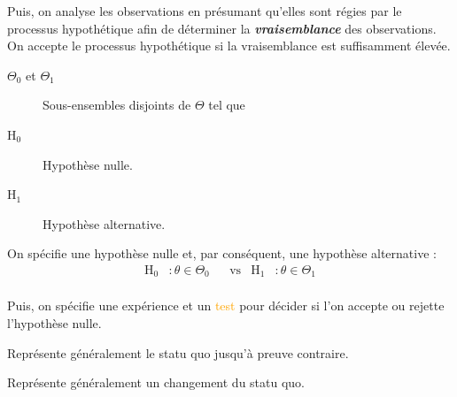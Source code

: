 \documentclass[french]{article}
\begin{document}
\begin{multicols*}{2}
\begin{rappel_enhanced}[Contexte]
\bigskip

Puis, on analyse les observations en présumant qu'elles sont régies par le processus hypothétique afin de déterminer la \textit{\textbf{vraisemblance}} des observations. On accepte le processus hypothétique si la vraisemblance est suffisamment élevée.



\end{rappel_enhanced}

\begin{distributions}[Notation]
\begin{description}
	\item[$\Theta_{0}$ et $\Theta_{1}$]	Sous-ensembles disjoints de $\Theta$ tel que 
	\item[$\textrm{H}_{0}$]	Hypothèse nulle.
	\item[$\textrm{H}_{1}$]	Hypothèse alternative.
\end{description}
\end{distributions}


\begin{definitionNOHFILL}
On spécifie une \textcolor{burntorange}{hypothèse} nulle et, par conséquent, une hypothèse alternative :
\begin{align*}
	\textrm{H}_{0}
	&:	\theta \in \Theta_{0}	&
	&\text{vs}	&
	\textrm{H}_{1}
	&:	\theta \in \Theta_{1}	\\
\end{align*}

Puis, on spécifie une \textcolor{orange-red}{expérience} et un \textcolor{orange}{test} pour décider si l'on accepte ou rejette l'hypothèse nulle.

\begin{definitionNOHFILLsub}
Représente généralement le statu quo jusqu'à preuve contraire.
\end{definitionNOHFILLsub}

\begin{definitionNOHFILLsub}
Représente généralement un changement du statu quo.
\end{definitionNOHFILLsub}


\end{definitionNOHFILL}
\end{multicols*}
\end{document}
